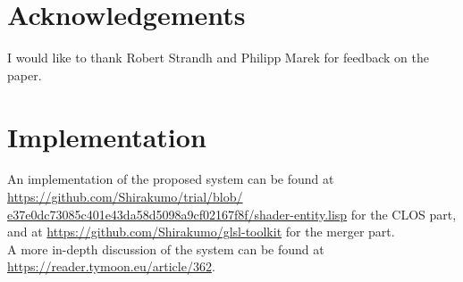 \documentclass{sig-alternate}
\begin{document}
\section{Acknowledgements}\label{section:7}
I would like to thank Robert Strandh and Philipp Marek for feedback on the paper.

\section{Implementation}\label{section:8}
An implementation of the proposed system can be found at \href{https://github.com/Shirakumo/trial/blob/e37e0dc73085c401e43da58d5098a9cf02167f8f/shader-entity.lisp}{https://github.com/Shirakumo/trial/blob/\\e37e0dc73085c401e43da58d5098a9cf02167f8f/shader-entity.lisp} for the CLOS part, and at \url{https://github.com/Shirakumo/glsl-toolkit} for the merger part. \\

A more in-depth discussion of the system can be found at \\\url{https://reader.tymoon.eu/article/362}.


\end{document}

